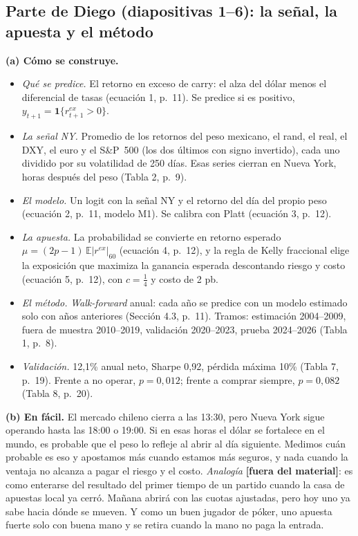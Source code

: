 \documentclass[11pt]{article}
\newcommand{\fuera}{\textcolor{red!60!black}{\textbf{[fuera del material]}}}
\begin{document}
\subsection*{Parte de Diego (diapositivas 1--6): la señal, la apuesta y el método}
\textbf{(a) Cómo se construye.}
\begin{itemize}
\item \emph{Qué se predice.} El retorno en exceso de carry: el alza del dólar menos el diferencial de tasas (ecuación 1, p.~11). Se predice si es positivo, \(y_{t+1}=\mathbf{1}\{r^{ex}_{t+1}>0\}\).
\item \emph{La señal NY.} Promedio de los retornos del peso mexicano, el rand, el real, el DXY, el euro y el S\&P~500 (los dos últimos con signo invertido), cada uno dividido por su volatilidad de 250 días. Esas series cierran en Nueva York, horas después del peso (Tabla 2, p.~9).
\item \emph{El modelo.} Un logit con la señal NY y el retorno del día del propio peso (ecuación 2, p.~11, modelo M1). Se calibra con Platt (ecuación 3, p.~12).
\item \emph{La apuesta.} La probabilidad se convierte en retorno esperado \(\mu=(2p-1)\,\mathbb{E}|r^{ex}|_{60}\) (ecuación 4, p.~12), y la regla de Kelly fraccional elige la exposición que maximiza la ganancia esperada descontando riesgo y costo (ecuación 5, p.~12), con \(c=\tfrac14\) y costo de 2 pb.
\item \emph{El método.} \emph{Walk-forward} anual: cada año se predice con un modelo estimado solo con años anteriores (Sección 4.3, p.~11). Tramos: estimación 2004--2009, fuera de muestra 2010--2019, validación 2020--2023, prueba 2024--2026 (Tabla 1, p.~8).
\item \emph{Validación.} 12,1\% anual neto, Sharpe 0,92, pérdida máxima 10\% (Tabla 7, p.~19). Frente a no operar, \(p=0{,}012\); frente a comprar siempre, \(p=0{,}082\) (Tabla 8, p.~20).
\end{itemize}
\textbf{(b) En fácil.} El mercado chileno cierra a las 13:30, pero Nueva York sigue operando hasta las 18:00 o 19:00. Si en esas horas el dólar se fortalece en el mundo, es probable que el peso lo refleje al abrir al día siguiente. Medimos cuán probable es eso y apostamos más cuando estamos más seguros, y nada cuando la ventaja no alcanza a pagar el riesgo y el costo.
\emph{Analogía} \fuera: es como enterarse del resultado del primer tiempo de un partido cuando la casa de apuestas local ya cerró. Mañana abrirá con las cuotas ajustadas, pero hoy uno ya sabe hacia dónde se mueven. Y como un buen jugador de póker, uno apuesta fuerte solo con buena mano y se retira cuando la mano no paga la entrada.
\end{document}
